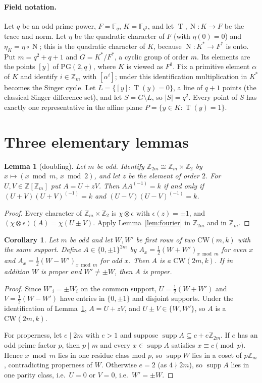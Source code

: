 \documentclass[11pt]{article}
\numberwithin{equation}{section}
\newtheorem{lemma}[theorem]{Lemma}
\newtheorem{corollary}[theorem]{Corollary}
\theoremstyle{definition}
\theoremstyle{remark}
\newcommand{\Z}{\mathbb Z}
\newcommand{\F}{\mathbb F}
\newcommand{\CW}{\mathrm{CW}}
\DeclareMathOperator{\supp}{supp}
\DeclareMathOperator{\Tr}{T}
\DeclareMathOperator{\Nm}{N}
\begin{document}
\paragraph{Field notation.} Let $q$ be an odd prime power, $F=\F_q$, $K=\F_{q^3}$, and let
$\Tr,\Nm\colon K\to F$ be the trace and norm. Let $\eta$ be the quadratic character of $F$
(with $\eta(0)=0$) and $\eta_K=\eta\circ \Nm$; this is the quadratic character of $K$, because
$\Nm\colon K^*\to F^*$ is onto. Put $m=q^2+q+1$ and $G=K^*/F^*$, a cyclic group of order $m$.
Its elements are the points $[y]$ of $\mathrm{PG}(2,q)$, where $K$ is viewed as $F^3$.
Fix a primitive element $\alpha$ of $K$ and identify $i\in\Z_m$ with $[\alpha^i]$; under this
identification multiplication in $K^*$ becomes the Singer cycle.
Let $L=\{[y]:\Tr(y)=0\}$, a line of $q+1$ points (the classical Singer difference set), and let
$S=G\setminus L$, so $|S|=q^2$. Every point of $S$ has exactly one representative in the affine
plane $P=\{y\in K:\Tr(y)=1\}$.

\section{Three elementary lemmas}\label{sec:lemmas}

\begin{lemma}[doubling]\label{lem:doubling}
Let $m$ be odd. Identify $\Z_{2m}\cong\Z_m\times\Z_2$ by $x\mapsto(x\bmod m,\,x\bmod 2)$, and
let $z$ be the element of order $2$. For $U,V\in\Z[\Z_m]$ put $A=U+zV$. Then $AA^{(-1)}=k$ if
and only if $(U+V)(U+V)^{(-1)}=k$ and $(U-V)(U-V)^{(-1)}=k$.
\end{lemma}
\begin{proof}
Every character of $\Z_m\times\Z_2$ is $\chi\otimes\epsilon$ with $\epsilon(z)=\pm1$, and
$(\chi\otimes\epsilon)(A)=\chi(U\pm V)$. Apply Lemma~\ref{lem:fourier} in $\Z_{2m}$ and in
$\Z_m$.
\end{proof}

\begin{corollary}\label{cor:samesupport}
Let $m$ be odd and let $W,W'$ be first rows of two $\CW(m,k)$ with the same support. Define
$A\in\{0,\pm1\}^{2m}$ by $A_x=\tfrac12(W+W')_{x\bmod m}$ for even $x$ and
$A_x=\tfrac12(W-W')_{x\bmod m}$ for odd $x$. Then $A$ is a $\CW(2m,k)$.
If in addition $W$ is proper and $W'\ne\pm W$, then $A$ is proper.
\end{corollary}
\begin{proof}
Since $W'_i=\pm W_i$ on the common support, $U=\frac12(W+W')$ and $V=\frac12(W-W')$ have
entries in $\{0,\pm1\}$ and disjoint supports. Under the identification of
Lemma~\ref{lem:doubling}, $A=U+zV$, and $U\pm V\in\{W,W'\}$, so $A$ is a $\CW(2m,k)$.

For properness, let $e\mid 2m$ with $e>1$ and suppose $\supp A\subseteq c+e\Z_{2m}$.
If $e$ has an odd prime factor $p$, then $p\mid m$ and every $x\in\supp A$ satisfies
$x\equiv c\pmod p$. Hence $x\bmod m$ lies in one residue class mod $p$, so $\supp W$ lies in a
coset of $p\Z_m$, contradicting properness of $W$. Otherwise $e=2$ (as $4\nmid 2m$), so
$\supp A$ lies in one parity class, i.e.\ $U=0$ or $V=0$, i.e.\ $W'=\pm W$.
\end{proof}
\end{document}
